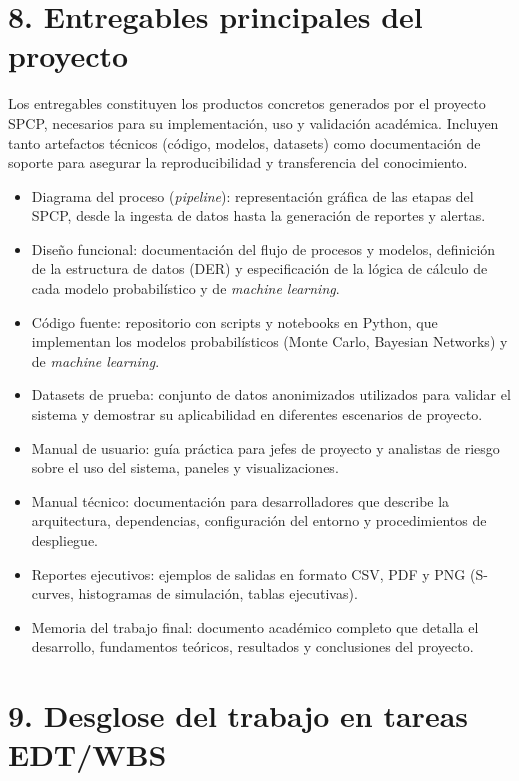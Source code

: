 \documentclass[12pt]
{charter}
\begin{document}
\section{8. Entregables principales del proyecto}
\label{sec:entregables}

Los entregables constituyen los productos concretos generados por el proyecto SPCP, necesarios para su implementación, uso y validación académica. Incluyen tanto artefactos técnicos (código, modelos, datasets) como documentación de soporte para asegurar la reproducibilidad y transferencia del conocimiento.

\begin{itemize}
  \item Diagrama del proceso (\textit{pipeline}): representación gráfica de las etapas del SPCP, desde la ingesta de datos hasta la generación de reportes y alertas.
  \item Diseño funcional: documentación del flujo de procesos y modelos, definición de la estructura de datos (DER) y especificación de la lógica de cálculo de cada modelo probabilístico y de \textit{machine learning}.
  \item Código fuente: repositorio con scripts y notebooks en Python, que implementan los modelos probabilísticos (Monte Carlo, Bayesian Networks) y de \textit{machine learning}.
  \item Datasets de prueba: conjunto de datos anonimizados utilizados para validar el sistema y demostrar su aplicabilidad en diferentes escenarios de proyecto.
  \item Manual de usuario: guía práctica para jefes de proyecto y analistas de riesgo sobre el uso del sistema, paneles y visualizaciones.
  \item Manual técnico: documentación para desarrolladores que describe la arquitectura, dependencias, configuración del entorno y procedimientos de despliegue.
  \item Reportes ejecutivos: ejemplos de salidas en formato CSV, PDF y PNG (S-curves, histogramas de simulación, tablas ejecutivas).
  \item Memoria del trabajo final: documento académico completo que detalla el desarrollo, fundamentos teóricos, resultados y conclusiones del proyecto.
\end{itemize}


\section{9. Desglose del trabajo en tareas EDT/WBS}
\label{sec:wbs}
\end{document}

